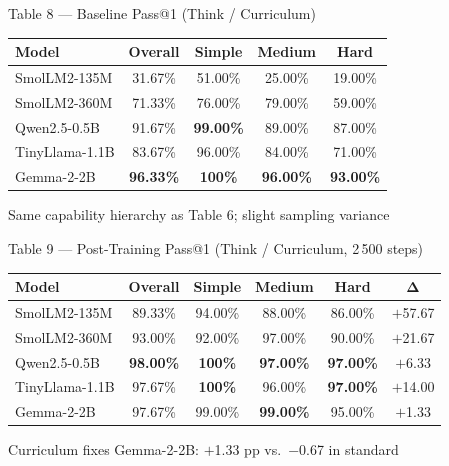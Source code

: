 \documentclass[10pt, aspectratio=169]{beamer}
\begin{document}
\begin{frame}{Table 8 — Baseline Pass@1 (Think / Curriculum)}
  \centering
  \footnotesize
  \renewcommand{\arraystretch}{1.55}
  \setlength\tabcolsep{10pt}
  \begin{tabular}{@{}lcccc@{}}
    \toprule
    \textbf{Model} & \textbf{Overall} & \textbf{Simple} & \textbf{Medium} & \textbf{Hard} \\
    \midrule
    SmolLM2-135M   & 31.67\% & 51.00\% & 25.00\% & 19.00\% \\
    SmolLM2-360M   & 71.33\% & 76.00\% & 79.00\% & 59.00\% \\
    Qwen2.5-0.5B   & 91.67\% & \textbf{99.00\%} & 89.00\% & 87.00\% \\
    TinyLlama-1.1B & 83.67\% & 96.00\% & 84.00\% & 71.00\% \\
    Gemma-2-2B     & \textbf{96.33\%} & \textbf{100\%} & \textbf{96.00\%} & \textbf{93.00\%} \\
    \bottomrule
  \end{tabular}
  \vspace{0.6em}

  \small Same capability hierarchy as Table 6; slight sampling variance
\end{frame}

\begin{frame}{Table 9 — Post-Training Pass@1 (Think / Curriculum, 2\,500 steps)}
  \centering
  \footnotesize
  \renewcommand{\arraystretch}{1.55}
  \setlength\tabcolsep{7pt}
  \begin{tabular}{@{}lccccc@{}}
    \toprule
    \textbf{Model} & \textbf{Overall} & \textbf{Simple} & \textbf{Medium} & \textbf{Hard} & $\boldsymbol{\Delta}$ \\
    \midrule
    SmolLM2-135M   & 89.33\% & 94.00\% & 88.00\% & 86.00\% & \alert{$+$57.67} \\
    SmolLM2-360M   & 93.00\% & 92.00\% & 97.00\% & 90.00\% & $+$21.67 \\
    Qwen2.5-0.5B   & \textbf{98.00\%} & \textbf{100\%} & \textbf{97.00\%} & \textbf{97.00\%} & $+$6.33  \\
    TinyLlama-1.1B & 97.67\% & \textbf{100\%} & 96.00\% & \textbf{97.00\%} & $+$14.00 \\
    Gemma-2-2B     & 97.67\% & 99.00\% & \textbf{99.00\%} & 95.00\% & $+$1.33  \\
    \bottomrule
  \end{tabular}
  \vspace{0.5em}

  \small Curriculum fixes Gemma-2-2B: $+$1.33 pp vs.\ $-$0.67 in standard
\end{frame}
\end{document}
